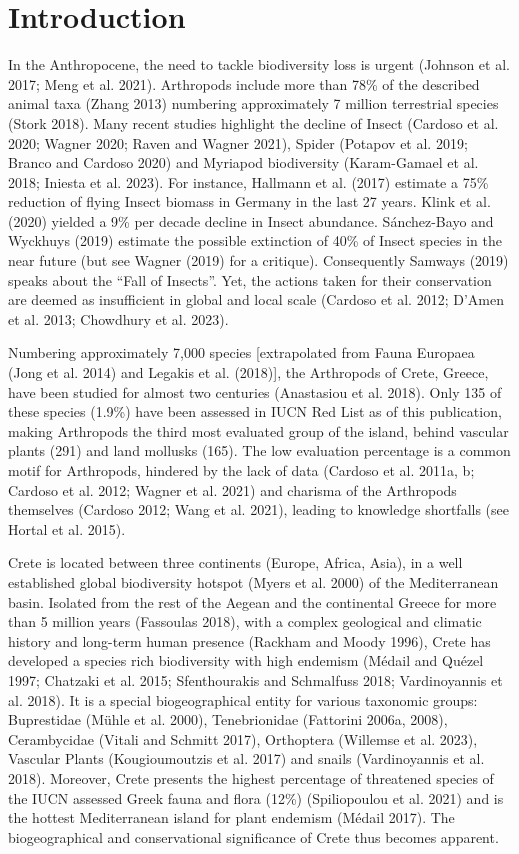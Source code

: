\section{Introduction}
\label{sec:arthropods-intro}

In the Anthropocene, the need to tackle biodiversity loss is urgent (Johnson et al. 2017; Meng et al. 2021).
Arthropods include more than 78\% of the described animal taxa (Zhang 2013)
numbering approximately 7 million terrestrial species (Stork 2018). Many recent
studies highlight the decline of Insect (Cardoso et al. 2020; Wagner 2020; Raven and Wagner 2021),
Spider (Potapov et al. 2019; Branco and Cardoso 2020) and Myriapod biodiversity (Karam-Gamael et al. 2018; Iniesta et al. 2023).
For instance, Hallmann et al. (2017) estimate a 75\% reduction of flying Insect
biomass in Germany in the last 27 years. Klink et al. (2020) yielded a 9\% per
decade decline in Insect abundance. Sánchez-Bayo and Wyckhuys (2019) estimate
the possible extinction of 40\% of Insect species in the near future (but see
Wagner (2019) for a critique). Consequently Samways (2019) speaks about the “Fall of Insects”.
Yet, the actions taken for their conservation are deemed as insufficient in
global and local scale (Cardoso et al. 2012; D’Amen et al. 2013; Chowdhury et al. 2023).

Numbering approximately 7,000 species [extrapolated from Fauna Europaea
(Jong et al. 2014) and Legakis et al. (2018)], the Arthropods of Crete, Greece,
have been studied for almost two centuries (Anastasiou et al. 2018).
Only 135 of these species (1.9\%) have been assessed in IUCN Red List as of
this publication, making Arthropods the third most evaluated group of the
island, behind vascular plants (291) and land mollusks (165). The low
evaluation percentage is a common motif for Arthropods, hindered by the lack of
data (Cardoso et al. 2011a, b; Cardoso et al. 2012; Wagner et al. 2021) and
charisma of the Arthropods themselves (Cardoso 2012; Wang et al. 2021), leading
to knowledge shortfalls (see Hortal et al. 2015).

Crete is located between three continents (Europe, Africa, Asia), in a
well established global biodiversity hotspot (Myers et al. 2000) of the
Mediterranean basin. Isolated from the rest of the Aegean and the continental
Greece for more than 5 million years (Fassoulas 2018), with a complex geological
and climatic history and long-term human presence (Rackham and Moody 1996),
Crete has developed a species rich biodiversity with high endemism
(Médail and Quézel 1997; Chatzaki et al. 2015; Sfenthourakis and Schmalfuss 2018; Vardinoyannis et al. 2018).
It is a special biogeographical entity for various taxonomic groups: Buprestidae (Mühle et al. 2000),
Tenebrionidae (Fattorini 2006a, 2008), Cerambycidae (Vitali and Schmitt 2017),
Orthoptera (Willemse et al. 2023), Vascular Plants (Kougioumoutzis et al. 2017)
and snails (Vardinoyannis et al. 2018). Moreover, Crete presents the highest
percentage of threatened species of the IUCN assessed Greek fauna and flora
(12\%) (Spiliopoulou et al. 2021) and is the hottest Mediterranean island for
plant endemism (Médail 2017). The biogeographical and conservational
significance of Crete thus becomes apparent.

